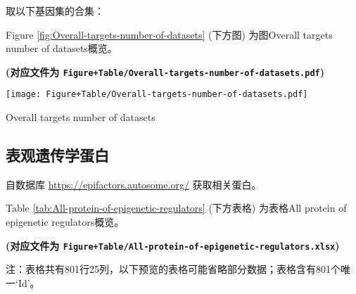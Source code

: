 \documentclass[
]{article}
\begin{document}
取以下基因集的合集：

Figure \ref{fig:Overall-targets-number-of-datasets} (下方图) 为图Overall targets number of datasets概览。

\textbf{(对应文件为 \texttt{Figure+Table/Overall-targets-number-of-datasets.pdf})}

\def\@captype{figure}
\begin{center}
\texttt{[image: Figure+Table/Overall-targets-number-of-datasets.pdf]}
\caption{Overall targets number of datasets}\label{fig:Overall-targets-number-of-datasets}
\end{center}

\hypertarget{ux8868ux89c2ux9057ux4f20ux5b66ux86cbux767d}{%
\subsection{表观遗传学蛋白}\label{ux8868ux89c2ux9057ux4f20ux5b66ux86cbux767d}}

自数据库 \url{https://epifactors.autosome.org/} 获取相关蛋白。

Table \ref{tab:All-protein-of-epigenetic-regulators} (下方表格) 为表格All protein of epigenetic regulators概览。

\textbf{(对应文件为 \texttt{Figure+Table/All-protein-of-epigenetic-regulators.xlsx})}

\begin{center}\begin{tcolorbox}[colback=gray!10, colframe=gray!50, width=0.9\linewidth, arc=1mm, boxrule=0.5pt]注：表格共有801行25列，以下预览的表格可能省略部分数据；表格含有801个唯一`Id'。
\end{tcolorbox}
\end{center}
\end{document}
